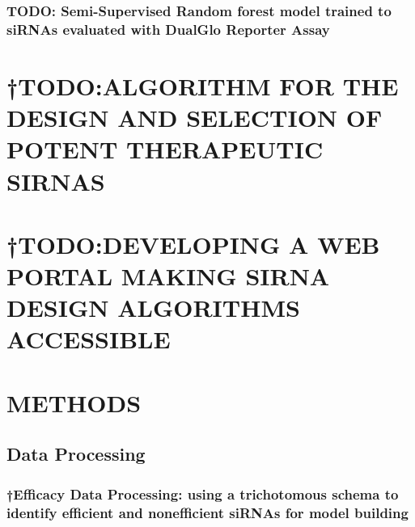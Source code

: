 \documentclass{report}
\begin{document}
\subsection{TODO: Semi-Supervised Random forest model trained to siRNAs evaluated with DualGlo Reporter Assay}


\chapter{†TODO:ALGORITHM FOR THE DESIGN AND SELECTION OF POTENT THERAPEUTIC SIRNAS}


\chapter{†TODO:DEVELOPING A WEB PORTAL MAKING SIRNA DESIGN ALGORITHMS ACCESSIBLE}


\chapter{METHODS}

\section{Data Processing}

\subsection{†Efficacy Data Processing: using a trichotomous schema to identify efficient and nonefficient siRNAs for model building}
\end{document}
